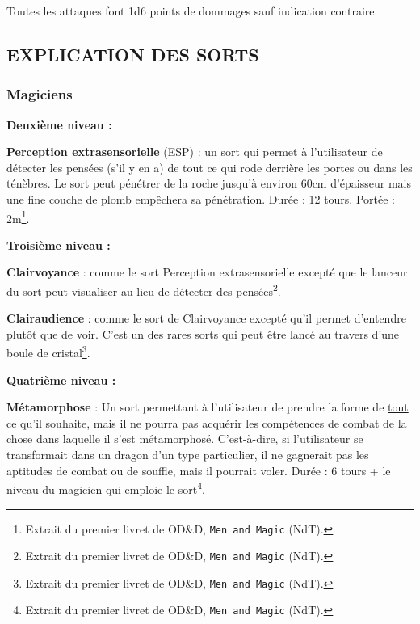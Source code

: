 \documentclass[11pt]{article}
\begin{document}
{\bigskip

Toutes les attaques font 1d6 points de dommages sauf indication contraire.

\subsection*{EXPLICATION DES SORTS}

\subsubsection*{Magiciens}

\textbf{Deuxième niveau :}

\bigskip

\label{sort-esp}\textbf{Perception extrasensorielle} (ESP) : un sort qui permet à l'utilisateur de détecter les pensées (s'il y en a) de tout ce qui rode derrière les portes ou dans les ténèbres. Le sort peut pénétrer de la roche jusqu'à environ 60cm d'épaisseur mais une fine couche de plomb empêchera sa pénétration. Durée : 12 tours. Portée : 2m\footnote{Extrait du premier livret de OD\&D, \texttt{Men and Magic} (NdT).}.

\bigskip

\textbf{Troisième niveau :}

\bigskip

\textbf{Clairvoyance} : comme le sort Perception extrasensorielle excepté que le lanceur du sort peut visualiser au lieu de détecter des pensées\footnote{Extrait du premier livret de OD\&D, \texttt{Men and Magic} (NdT).}.

\bigskip

\label{sort-clairaudience}\textbf{Clairaudience} : comme le sort de Clairvoyance excepté qu'il permet d'entendre plutôt que de voir. C'est un des rares sorts qui peut être lancé au travers d'une boule de cristal\footnote{Extrait du premier livret de OD\&D, \texttt{Men and Magic} (NdT).}.

\bigskip

\textbf{Quatrième niveau :}

\bigskip

\label{sort-metamorphose}\textbf{Métamorphose} : Un sort permettant à l'utilisateur de prendre la forme de \underline{tout} ce qu'il souhaite, mais il ne pourra pas acquérir les compétences de combat de la chose dans laquelle il s'est métamorphosé. C'est-à-dire, si l'utilisateur se transformait dans un dragon d'un type particulier, il ne gagnerait pas les aptitudes de combat ou de souffle, mais il pourrait voler. Durée : 6 tours + le niveau du magicien qui emploie le sort\footnote{Extrait du premier livret de OD\&D, \texttt{Men and Magic} (NdT).}.

}
\end{document}
